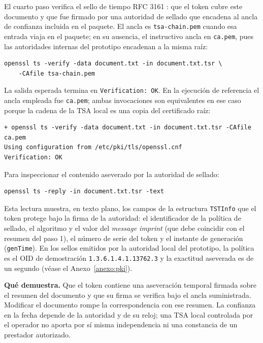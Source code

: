 El cuarto paso verifica el sello de tiempo RFC 3161 \cite{adams2001}: que el token cubre este documento y que fue firmado por una autoridad de sellado que encadena al ancla de confianza incluida en el paquete. El ancla es \texttt{tsa-chain.pem} cuando esa entrada viaja en el paquete; en su ausencia, el instructivo ancla en \texttt{ca.pem}, pues las autoridades internas del prototipo encadenan a la misma raíz:

\begin{lstlisting}[numbers=none]
openssl ts -verify -data document.txt -in document.txt.tsr \
    -CAfile tsa-chain.pem
\end{lstlisting}

La salida esperada termina en \texttt{Verification: OK}. En la ejecución de referencia el ancla empleada fue \texttt{ca.pem}; ambas invocaciones son equivalentes en ese caso porque la cadena de la TSA local es una copia del certificado raíz:

\begin{lstlisting}[numbers=none]
+ openssl ts -verify -data document.txt -in document.txt.tsr -CAfile ca.pem
Using configuration from /etc/pki/tls/openssl.cnf
Verification: OK
\end{lstlisting}

Para inspeccionar el contenido aseverado por la autoridad de sellado:

\begin{lstlisting}[numbers=none]
openssl ts -reply -in document.txt.tsr -text
\end{lstlisting}

Esta lectura muestra, en texto plano, los campos de la estructura \texttt{TSTInfo} que el token protege bajo la firma de la autoridad: el identificador de la política de sellado, el algoritmo y el valor del \emph{message imprint} (que debe coincidir con el resumen del paso 1), el número de serie del token y el instante de generación (\texttt{genTime}). En los sellos emitidos por la autoridad local del prototipo, la política es el OID de demostración \texttt{1.3.6.1.4.1.13762.3} y la exactitud aseverada es de un segundo (véase el Anexo~\ref{anexo:pki}).

\textbf{Qué demuestra.} Que el token contiene una aseveración temporal firmada sobre el resumen del documento y que su firma se verifica bajo el ancla suministrada. Modificar el documento rompe la correspondencia con ese resumen. La confianza en la fecha depende de la autoridad y de su reloj; una TSA local controlada por el operador no aporta por sí misma independencia ni una constancia de un prestador autorizado.

